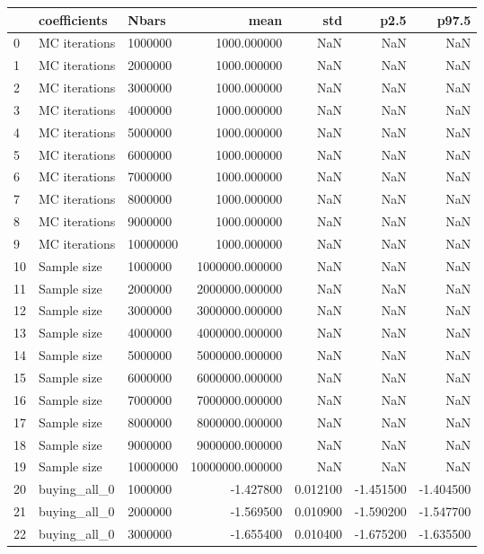 \begin{tabular}{lllrrrr}
\toprule
 & coefficients & Nbars & mean & std & p2.5 & p97.5 \\
\midrule
0 & MC iterations & 1000000 & 1000.000000 & NaN & NaN & NaN \\
1 & MC iterations & 2000000 & 1000.000000 & NaN & NaN & NaN \\
2 & MC iterations & 3000000 & 1000.000000 & NaN & NaN & NaN \\
3 & MC iterations & 4000000 & 1000.000000 & NaN & NaN & NaN \\
4 & MC iterations & 5000000 & 1000.000000 & NaN & NaN & NaN \\
5 & MC iterations & 6000000 & 1000.000000 & NaN & NaN & NaN \\
6 & MC iterations & 7000000 & 1000.000000 & NaN & NaN & NaN \\
7 & MC iterations & 8000000 & 1000.000000 & NaN & NaN & NaN \\
8 & MC iterations & 9000000 & 1000.000000 & NaN & NaN & NaN \\
9 & MC iterations & 10000000 & 1000.000000 & NaN & NaN & NaN \\
10 & Sample size & 1000000 & 1000000.000000 & NaN & NaN & NaN \\
11 & Sample size & 2000000 & 2000000.000000 & NaN & NaN & NaN \\
12 & Sample size & 3000000 & 3000000.000000 & NaN & NaN & NaN \\
13 & Sample size & 4000000 & 4000000.000000 & NaN & NaN & NaN \\
14 & Sample size & 5000000 & 5000000.000000 & NaN & NaN & NaN \\
15 & Sample size & 6000000 & 6000000.000000 & NaN & NaN & NaN \\
16 & Sample size & 7000000 & 7000000.000000 & NaN & NaN & NaN \\
17 & Sample size & 8000000 & 8000000.000000 & NaN & NaN & NaN \\
18 & Sample size & 9000000 & 9000000.000000 & NaN & NaN & NaN \\
19 & Sample size & 10000000 & 10000000.000000 & NaN & NaN & NaN \\
20 & buying_all_0 & 1000000 & -1.427800 & 0.012100 & -1.451500 & -1.404500 \\
21 & buying_all_0 & 2000000 & -1.569500 & 0.010900 & -1.590200 & -1.547700 \\
22 & buying_all_0 & 3000000 & -1.655400 & 0.010400 & -1.675200 & -1.635500 \\

\end{tabular}
